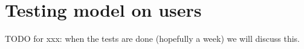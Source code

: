 
\chapter{Testing model on users}

TODO for xxx: when the tests are done (hopefully a week) we will discuss this.